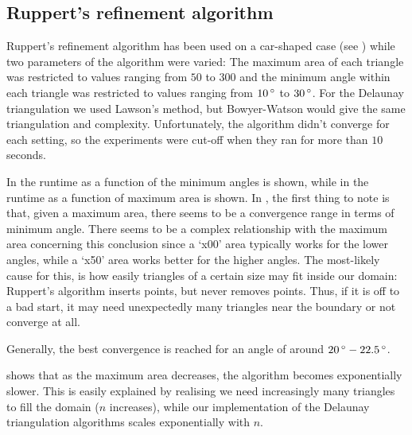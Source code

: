 \subsection{Ruppert's refinement algorithm}
\label{sub:results:ruppert}

Ruppert's refinement algorithm has been used on a car-shaped case (see ) while two parameters of the algorithm were varied:
The maximum area of each triangle was restricted to values ranging from $50$ to $300$ and
the minimum angle within each triangle was restricted to values ranging from $10\,^{\circ}$ to $30\,^{\circ}$.
For the Delaunay triangulation we used Lawson's method, but Bowyer-Watson would give the same triangulation and complexity.
Unfortunately, the algorithm didn't converge for each setting, so the experiments were cut-off when they ran for more than $10$ seconds.

In  the runtime as a function of the minimum angles is shown, while in  the runtime as a function of maximum area is shown.
In , the first thing to note is that, given a maximum area, there seems to be a convergence range in terms of minimum angle.
There seems to be a complex relationship with the maximum area concerning this conclusion since a `x00' area typically works for the lower angles, while a `x50' area works better for the higher angles.
The most-likely cause for this, is how easily triangles of a certain size may fit inside our domain: Ruppert's algorithm inserts points, but never removes points.
Thus, if it is off to a bad start, it may need unexpectedly many triangles near the boundary or not converge at all.

Generally, the best convergence is reached for an angle of around $20\,^{\circ}-22.5\,^{\circ}$.

 shows that as the maximum area decreases, the algorithm becomes exponentially slower.
This is easily explained by realising we need increasingly many triangles to fill the domain ($n$ increases), while
our implementation of the Delaunay triangulation algorithms scales exponentially with $n$.


